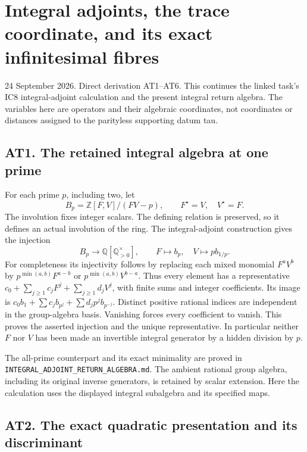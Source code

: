 \documentclass[
]{article}
\begin{document}
\section{Integral adjoints, the trace coordinate, and its exact
infinitesimal
fibres}\label{integral-adjoints-the-trace-coordinate-and-its-exact-infinitesimal-fibres}

24 September 2026. Direct derivation AT1--AT6. This continues the linked
task's IC8 integral-adjoint calculation and the present integral return
algebra. The variables here are operators and their algebraic
coordinates, not coordinates or distances assigned to the parityless
supporting datum tau.

\subsection{AT1. The retained integral algebra at one
prime}\label{at1.-the-retained-integral-algebra-at-one-prime}

For each prime \(p\), including two, let \[
B_p=\mathbb Z[F,V]/(FV-p),\qquad F^\star=V,\quad V^\star=F.
\tag{AT1.1}
\] The involution fixes integer scalars. The defining relation is
preserved, so it defines an actual involution of the ring. The
integral-adjoint construction gives the injection \[
B_p\longrightarrow\mathbb Q[\mathbb Q_{>0}^{\times}],\qquad
F\longmapsto b_p,\quad V\longmapsto p b_{1/p}.
\tag{AT1.2}
\] For completeness its injectivity follows by replacing each mixed
monomial \(F^aV^b\) by \(p^{\min(a,b)}F^{a-b}\) or
\(p^{\min(a,b)}V^{b-a}\). Thus every element has a representative
\(c_0+\sum_{j\ge1}c_jF^j+\sum_{j\ge1}d_jV^j\), with finite sums and
integer coefficients. Its image is
\(c_0b_1+\sum c_jb_{p^j}+\sum d_jp^jb_{p^{-j}}\). Distinct positive
rational indices are independent in the group-algebra basis. Vanishing
forces every coefficient to vanish. This proves the asserted injection
and the unique representative. In particular neither \(F\) nor \(V\) has
been made an invertible integral generator by a hidden division by
\(p\).

The all-prime counterpart and its exact minimality are proved in
\nolinkurl{INTEGRAL_ADJOINT_RETURN_ALGEBRA.md}. The ambient rational
group algebra, including its original inverse generators, is retained by
scalar extension. Here the calculation uses the displayed integral
subalgebra and its specified maps.

\subsection{AT2. The exact quadratic presentation and its
discriminant}\label{at2.-the-exact-quadratic-presentation-and-its-discriminant}
\end{document}
